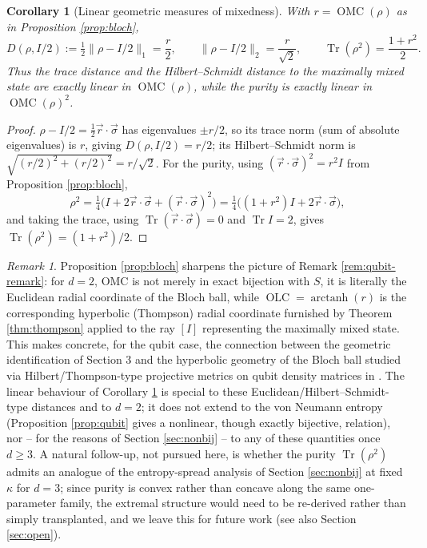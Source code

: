 \documentclass{article}
\newtheorem{corollary}[theorem]{Corollary}
\theoremstyle{remark}
\newtheorem{remark}[theorem]{Remark}
\providecommand{\QLC}{\operatorname{OLC}}
\providecommand{\QMC}{\operatorname{OMC}}
\begin{document}
\begin{corollary}[Linear geometric measures of mixedness]\label{cor:bloch-linear}
With $r=\QMC(\rho)$ as in Proposition \ref{prop:bloch},
\[
D(\rho,I/2) := \tfrac12\|\rho-I/2\|_1 = \frac r2, \qquad
\|\rho-I/2\|_2 = \frac r{\sqrt2}, \qquad
\operatorname{Tr}(\rho^2) = \frac{1+r^2}2.
\]
Thus the trace distance and the Hilbert--Schmidt distance to the maximally mixed state are exactly linear in $\QMC(\rho)$, while the purity is exactly linear in $\QMC(\rho)^2$.
\end{corollary}
\begin{proof}
$\rho-I/2=\tfrac12\vec r\cdot\vec\sigma$ has eigenvalues $\pm r/2$, so its trace norm (sum of absolute eigenvalues) is $r$, giving $D(\rho,I/2)=r/2$; its Hilbert--Schmidt norm is $\sqrt{(r/2)^2+(r/2)^2}=r/\sqrt2$. For the purity, using $(\vec r\cdot\vec\sigma)^2=r^2I$ from Proposition \ref{prop:bloch},
\[
\rho^2=\tfrac14\big(I+2\vec r\cdot\vec\sigma+(\vec r\cdot\vec\sigma)^2\big)=\tfrac14\big((1+r^2)I+2\vec r\cdot\vec\sigma\big),
\]
and taking the trace, using $\operatorname{Tr}(\vec r\cdot\vec\sigma)=0$ and $\operatorname{Tr}I=2$, gives $\operatorname{Tr}(\rho^2)=(1+r^2)/2$.
\end{proof}

\begin{remark}
Proposition \ref{prop:bloch} sharpens the picture of Remark \ref{rem:qubit-remark}: for $d=2$, OMC is not merely in exact bijection with $S$, it is literally the Euclidean radial coordinate of the Bloch ball, while $\QLC=\operatorname{arctanh}(r)$ is the corresponding hyperbolic (Thompson) radial coordinate furnished by Theorem \ref{thm:thompson} applied to the ray $[I]$ representing the maximally mixed state. This makes concrete, for the qubit case, the connection between the geometric identification of Section 3 and the hyperbolic geometry of the Bloch ball studied via Hilbert/Thompson-type projective metrics on qubit density matrices in \cite{park2015}. The linear behaviour of Corollary \ref{cor:bloch-linear} is special to these Euclidean/Hilbert--Schmidt-type distances and to $d=2$; it does not extend to the von Neumann entropy (Proposition \ref{prop:qubit} gives a nonlinear, though exactly bijective, relation), nor -- for the reasons of Section \ref{sec:nonbij} -- to any of these quantities once $d\ge3$. A natural follow-up, not pursued here, is whether the purity $\operatorname{Tr}(\rho^2)$ admits an analogue of the entropy-spread analysis of Section \ref{sec:nonbij} at fixed $\kappa$ for $d=3$; since purity is convex rather than concave along the same one-parameter family, the extremal structure would need to be re-derived rather than simply transplanted, and we leave this for future work (see also Section \ref{sec:open}).
\end{remark}
\end{document}
